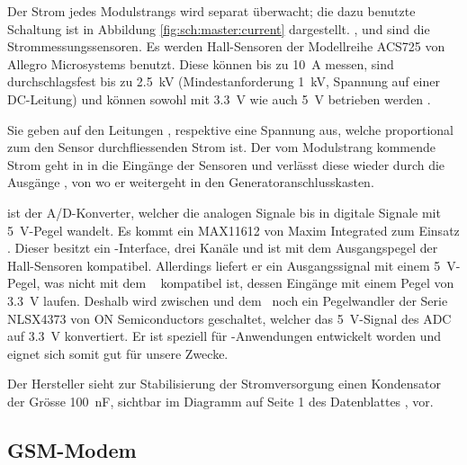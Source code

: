 Der  Strom jedes  Modulstrangs  wird separat  \"uberwacht;  die dazu  benutzte
Schaltung   ist   in   Abbildung   \ref{fig:sch:master:current}   dargestellt.
,    und    sind  die  Strommessungssensoren. Es
werden  Hall-Sensoren   der  Modellreihe   ACS725  von   Allegro  Microsystems
benutzt. Diese k\"onnen bis zu  \SI{10}{\ampere} messen, sind durchschlagsfest
bis zu  \SI{2.5}{\kilo\volt} (Mindestanforderung  \SI{1}{\kilo\volt}, Spannung
auf  einer  DC-Leitung)  und  k\"onnen sowohl  mit  \SI{3.3}{\volt}  wie  auch
\SI{5}{\volt} betrieben werden \cite{datasheet:hallic}.

Sie  geben   auf  den  Leitungen  ,     respektive
  eine   Spannung  aus,  welche  proportional   zum  den  Sensor
durchfliessenden Strom ist. Der vom Modulstrang  kommende Strom geht in in die
Eing\"ange  der Sensoren und verl\"asst diese wieder
durch die Ausg\"ange , von  wo er weitergeht in den
Generatoranschlusskasten.

   ist    der   A/D-Konverter,   welcher   die    analogen   Signale
 bis  in  digitale Signale mit \SI{5}{\volt}-Pegel
wandelt. Es   kommt   ein   MAX11612   von  Maxim   Integrated   zum   Einsatz
\cite{datasheet:adc}. Dieser besitzt ein \ISC-Interface, drei Kan\"ale und ist
mit  dem  Ausgangspegel  der  Hall-Sensoren  kompatibel.   Allerdings  liefert
er  ein  Ausgangssignal  mit  einem \SI{5}{\volt}-Pegel,  was  nicht  mit  dem
\Raspi~ kompatibel ist, dessen Eing\"ange  mit einem Pegel von \SI{3.3}{\volt}
laufen. Deshalb wird zwischen   und dem \Raspi~noch ein Pegelwandler
der   Serie   NLSX4373  von   ON   Semiconductors   geschaltet,  welcher   das
\SI{5}{\volt}-Signal des ADC auf  \SI{3.3}{\volt} konvertiert. Er ist speziell
f\"ur  \ISC-Anwendungen entwickelt  worden  und eignet  sich  somit gut  f\"ur
unsere Zwecke.

Der Hersteller sieht zur  Stabilisierung der Stromversorgung einen Kondensator
der  Gr\"osse \SI{100}{\nano\farad},  sichtbar  im Diagramm  auf  Seite 1  des
Datenblattes \cite{datasheet:hallic}, vor.

\clearpage
\subsection{GSM-Modem}
\label{subsec:hw:master:gsm}

